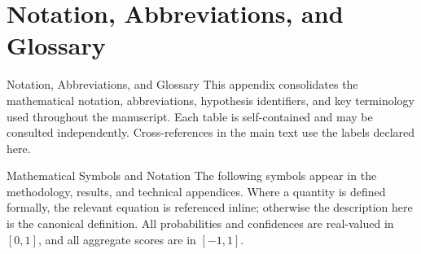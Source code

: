 \documentclass[
  ignorenonframetext,
]{beamer}
\author{\texorpdfstring{}{}}
\date{}
\begin{document}
\section{Notation, Abbreviations, and
Glossary}\label{notation-abbreviations-and-glossary}

\begin{frame}[allowframebreaks]{Notation, Abbreviations, and Glossary}
This appendix consolidates the mathematical notation, abbreviations,
hypothesis identifiers, and key terminology used throughout the
manuscript. Each table is self-contained and may be consulted
independently. Cross-references in the main text use the labels declared
here.
\end{frame}

\begin{frame}[allowframebreaks]{Mathematical Symbols and Notation}
\protect{}\label{mathematical-symbols-and-notation}
The following symbols appear in the methodology, results, and technical
appendices. Where a quantity is defined formally, the relevant equation
is referenced inline; otherwise the description here is the canonical
definition. All probabilities and confidences are real-valued in
\([0, 1]\), and all aggregate scores are in \([-1, 1]\).


\end{frame}
\end{document}
